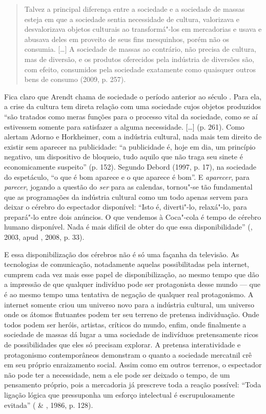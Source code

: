 \begin{quote}
Talvez a principal diferença entre a sociedade e a sociedade de massas
esteja em que a sociedade sentia necessidade de cultura, valorizava e
desvalorizava objetos culturais ao transformá"-los em mercadorias e usava
e abusava deles em proveito de seus fins mesquinhos, porém não os
consumia. [\ldots{}] A sociedade de massas ao contrário, não precisa
de cultura, mas de diversão, e os produtos oferecidos pela indústria de
diversões são, com efeito, consumidos pela sociedade exatamente como
quaisquer outros bens de consumo (2009, p. 257).
\end{quote}

Fica claro que Arendt chama de sociedade o período anterior ao século
. Para ela, a crise da cultura tem direta relação com uma sociedade
cujos objetos produzidos ``são tratados como meras funções para o
processo vital da sociedade, como se aí estivessem somente para
satisfazer a alguma necessidade. [\ldots{}] (p. 261). Como alertam
Adorno e Horkheimer, com a indústria cultural, nada mais tem
direito de existir sem aparecer na publicidade: ``a publicidade é, hoje
em dia, um princípio negativo, um dispositivo de bloqueio, tudo aquilo
que não traga seu sinete é economicamente suspeito'' (p. 152). Segundo
Debord (1997, p. 17), na sociedade do espetáculo, ``o que é bom aparece
e o que aparece é bom''. E \emph{aparecer}, para \emph{parecer},
jogando a questão do \emph{ser} para as calendas, tornou"-se tão
fundamental que as programações da indústria cultural como um todo
apenas servem para deixar o cérebro do espectador disponível: ``Isto é,
diverti"-lo, relaxá"-lo, para prepará"-lo entre dois anúncios. O que
vendemos à Coca"-cola é tempo de cérebro humano disponível. Nada é mais
difícil de obter do que essa disponibilidade'' (, 2003, apud
, 2008, p. 33).

E essa disponibilização dos cérebros não é só uma façanha da televisão.
As tecnologias de comunicação, notadamente aquelas possibilitadas pela
internet, cumprem cada vez mais esse papel de disponibilização, ao mesmo
tempo que dão a impressão de que qualquer indivíduo pode ser
protagonista desse mundo --- que é ao mesmo tempo uma tentativa de
negação de qualquer real protagonismo. A internet somente criou um
universo novo para a indústria cultural, um universo onde os átomos
flutuantes podem ter seu terreno de pretensa individuação. Onde todos
podem ser heróis, artistas, críticos do mundo, enfim, onde finalmente a
sociedade de massas dá lugar a uma sociedade de indivíduos pretensamente
ricos de possibilidades que eles só precisam explorar. A pretensa
interatividade e protagonismo contemporâneos demonstram o quanto a
sociedade mercatnil crê em seu próprio enraizamento social. Assim como
em outros terrenos, o espectador não pode ter a necessidade, nem a ele
pode ser deixado o tempo, de um pensamento próprio, pois a mercadoria já
prescreve toda a reação possível: ``Toda ligação lógica que pressuponha
um esforço intelectual é escrupulosamente evitada'' ( \&
, 1986, p. 128).

